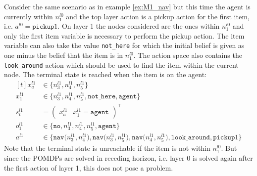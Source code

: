 \begin{example}
Consider the same scenario as in example \ref{ex:M1_nav} but this time the agent is currently within $n_1^{l0}$ and the top layer action is a pickup action for the first item, i.e. $a^{l0}=\texttt{pickup}1$. On layer 1 the nodes considered are the ones within $n_1^{l0}$ and only the first item variable is necessary to perform the pickup action. The item variable can also take the value \texttt{not\_here} for which the initial belief is given as one minus the belief that the item is in $n_1^{l0}$. The action space also contains the \texttt{look\_around} action which should be used to find the item within the current node. The terminal state is reached when the item is on the agent:
\begin{equation}
    \begin{aligned}[t] 
        x_a^{l1} &\in \big\{ n_3^{l1}, n_4^{l1}, n_5^{l1} \big\} \\
        x_1^{l1} &\in  \big\{ n_3^{l1}, n_4^{l1}, n_5^{l1}, \texttt{not\_here}, \texttt{agent} \big\}\\
         s_t^{l1} &= \begin{pmatrix} x_a^{l1} & x_1^{l1}=\texttt{agent} \end{pmatrix}^\intercal\\
        o_1^{l1} &\in \big\{\texttt{no},n_3^{l1}, n_4^{l1}, n_5^{l1}, \texttt{agent} \big\}\\
        a^{l1} &\in \big\{\texttt{nav($n_3^{l1}, n_4^{l1}$)}, \texttt{nav($n_3^{l1}, n_5^{l1}$)}, \texttt{nav($n_4^{l1}, n_5^{l1}$)}, \texttt{look\_around}, \texttt{pickup}1 \big\}
        \end{aligned}
\end{equation}
 Note that the terminal state is unreachable if the item is not within $n_1^{l0}$. But since the POMDPs are solved in receding horizon, i.e. layer 0 is solved again after the first action of layer 1, this does not pose a problem.
 \demo
\end{example}

